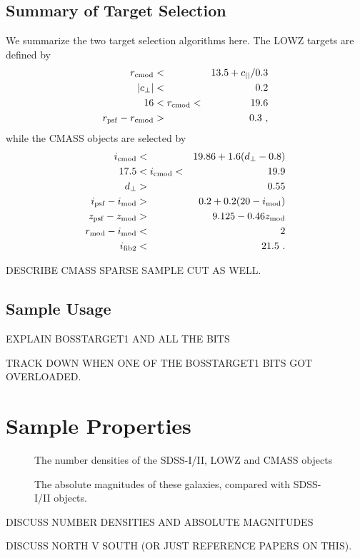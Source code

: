 \documentclass[preprint]{aastex}
\newcommand{\cpp}{c_{\perp}}
\newcommand{\cll}{c_{||}}
\newcommand{\dpp}{d_{\perp}}
\newcommand{\rmod}{r_{\rm mod}}
\newcommand{\imod}{i_{\rm mod}}
\newcommand{\rcmod}{r_{\rm cmod}}
\newcommand{\icmod}{i_{\rm cmod}}
\newcommand{\ipsf}{i_{\rm psf}}
\newcommand{\zpsf}{z_{\rm psf}}
\newcommand{\zmod}{z_{\rm mod}}
\newcommand{\rpsf}{r_{\rm psf}}
\newcommand{\ifib}{i_{\rm fib2}}
\begin{document}
\subsection{Summary of Target Selection}

We summarize the two target selection algorithms here. The LOWZ targets are
defined by 
\begin{eqnarray}
\rcmod  & < & 13.5 + \cll/0.3 \\ 
|\cpp| & < & 0.2 \\
16 & < \rcmod < & 19.6 \\
\rpsf - \rcmod & > & 0.3 \,\,,
\end{eqnarray}
while the CMASS objects are selected by 
\begin{eqnarray}
\icmod & < & 19.86 + 1.6(\dpp - 0.8) \\
17.5 & < \icmod <  & 19.9 \\
\dpp & > & 0.55 \\
\ipsf - \imod & > & 0.2 + 0.2(20 - \imod) \\
\zpsf - \zmod & > & 9.125 - 0.46 \zmod \\
\rmod - \imod & < & 2 \\
\ifib & < & 21.5 \,\,.
\end{eqnarray}

DESCRIBE CMASS SPARSE SAMPLE CUT AS WELL.

\subsection{Sample Usage}

EXPLAIN BOSSTARGET1 AND ALL THE BITS

TRACK DOWN WHEN ONE OF THE BOSSTARGET1 BITS GOT OVERLOADED.

\section{Sample Properties}

\begin{figure}
\caption{The number densities of the SDSS-I/II, LOWZ and CMASS objects}
\end{figure}

\begin{figure}
\caption{The absolute magnitudes of these galaxies, compared with SDSS-I/II
objects.}
\end{figure}

DISCUSS NUMBER DENSITIES AND ABSOLUTE MAGNITUDES

DISCUSS NORTH V SOUTH (OR JUST REFERENCE PAPERS ON THIS).
\end{document}

